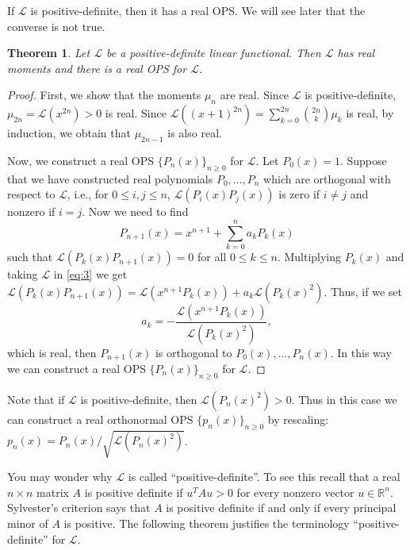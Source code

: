 \documentclass{amsart}
\numberwithin{equation}{section}
\newtheorem{thm}{Theorem}[section]
\theoremstyle{definition}
\newcommand{\RR}{\mathbb{R}}
\newcommand\LL{\mathcal{L}}
\begin{document}
If \( \LL \) is positive-definite, then it has a real OPS. We will see
later that the converse is not true.

\begin{thm}\label{thm:pos-def-ops}
  Let \( \LL \) be a positive-definite linear functional. Then
  \( \LL \) has real moments and there is a real OPS for \( \LL \).
\end{thm}

\begin{proof}
  First, we show that the moments \( \mu_n \) are real. Since
  \( \LL \) is positive-definite, \( \mu_{2n} = \LL(x^{2n}) >0 \) is
  real. Since
  \( \LL((x+1)^{2n}) = \sum_{k=0}^{2n}\binom{2n}{k} \mu_{k} \) is
  real, by induction, we obtain that \( \mu_{2n-1} \) is also real.

  Now, we construct a real OPS \( \{ P_n(x) \}_{n\ge 0} \) for
  \( \LL \). Let \( P_0(x) = 1 \). Suppose that we have constructed
  real polynomials \( P_0,\dots,P_n \) which are orthogonal with
  respect to \( \LL \), i.e., for \( 0\le i,j\le n \),
  \( \LL(P_i(x)P_j(x)) \) is zero if \( i\ne j \) and nonzero if
  \( i=j \). Now we need to find
  \begin{equation}\label{eq:3}
    P_{n+1} (x) = x^{n+1} + \sum_{k=0}^n a_k P_k(x)
  \end{equation}
  such that \( \LL(P_k(x)P_{n+1}(x)) = 0 \) for all \( 0\le k\le n \).
  Multiplying \( P_k(x) \) and taking \( \LL \) in \eqref{eq:3} we get
  \( \LL(P_k(x)P_{n+1}(x)) = \LL(x^{n+1}P_k(x))+a_k\LL(P_k(x)^2) \).
  Thus, if we set
  \[
    a_k = - \frac{\LL(x^{n+1}P_k(x))}{\LL(P_k(x)^2)},
  \]
  which is real, then \( P_{n+1}(x) \) is orthogonal to
  \( P_0(x),\dots,P_n(x) \). In this way we can construct a real OPS
  \( \{ P_n(x) \}_{n\ge 0} \) for \( \LL \).
\end{proof}

Note that if \( \LL \) is positive-definite, then
\( \LL(P_n(x)^2)>0 \). Thus in this case we can construct a real
orthonormal OPS \( \{ p_n(x) \}_{n\ge 0} \) by rescaling:
\( p_n(x) = P_n(x)/\sqrt{\LL(P_n(x)^2)} \).

\medskip

You may wonder why \( \LL \) is called ``positive-definite''. To see
this recall that a real \( n\times n \) matrix \( A \) is positive
definite if \( u^T A u >0 \) for every nonzero vector
\( u\in \RR^n \). Sylvester's criterion says that \( A \) is positive
definite if and only if every principal minor of \( A \) is positive.
The following theorem justifies the terminology ``positive-definite''
for \( \LL \).
\end{document}
